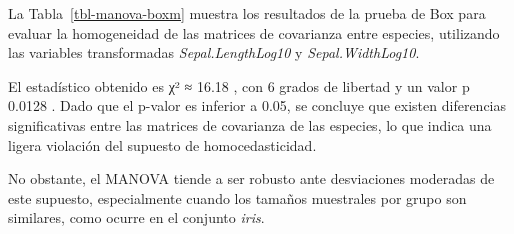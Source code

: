 \documentclass[
  spanish,
  11pt,
  a4paper,
  DIV=11,
  numbers=noendperiod]{scrartcl}
\newenvironment{Shaded}{\begin{snugshade}}{\end{snugshade}}
\newcommand{\AttributeTok}[1]{\textcolor[rgb]{0.40,0.45,0.13}{#1}}
\newcommand{\CommentTok}[1]{\textcolor[rgb]{0.37,0.37,0.37}{#1}}
\newcommand{\ControlFlowTok}[1]{\textcolor[rgb]{0.00,0.23,0.31}{\textbf{#1}}}
\newcommand{\FloatTok}[1]{\textcolor[rgb]{0.68,0.00,0.00}{#1}}
\newcommand{\FunctionTok}[1]{\textcolor[rgb]{0.28,0.35,0.67}{#1}}
\newcommand{\NormalTok}[1]{\textcolor[rgb]{0.00,0.23,0.31}{#1}}
\newcommand{\OtherTok}[1]{\textcolor[rgb]{0.00,0.23,0.31}{#1}}
\newcommand{\SpecialCharTok}[1]{\textcolor[rgb]{0.37,0.37,0.37}{#1}}
\begin{document}
La Tabla~\ref{tbl-manova-boxm} muestra los resultados de la prueba de
Box para evaluar la homogeneidad de las matrices de covarianza entre
especies, utilizando las variables transformadas
\emph{Sepal.LengthLog10} y \emph{Sepal.WidthLog10}.

El estadístico obtenido es χ² ≈ 16.18 , con 6 grados de libertad y un
valor p 0.0128 . Dado que el p-valor es inferior a 0.05, se concluye que
existen diferencias significativas entre las matrices de covarianza de
las especies, lo que indica una ligera violación del supuesto de
homocedasticidad.

No obstante, el MANOVA tiende a ser robusto ante desviaciones moderadas
de este supuesto, especialmente cuando los tamaños muestrales por grupo
son similares, como ocurre en el conjunto \emph{iris}.

\begin{Shaded}
\end{Shaded}
\end{document}
